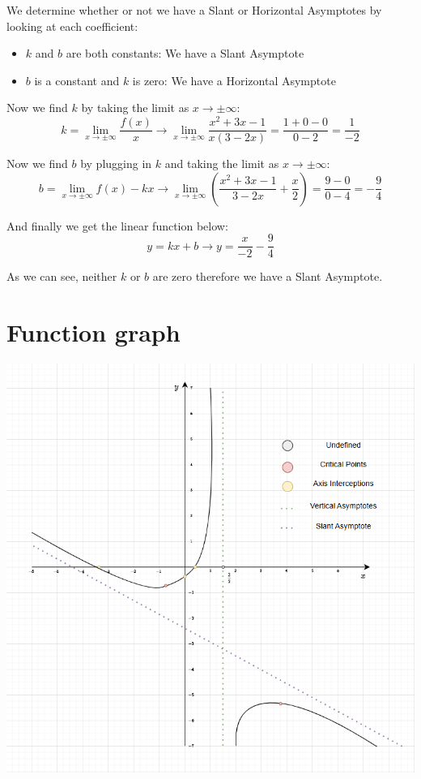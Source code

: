 \documentclass[11pt]{article}
\begin{document}
We determine whether or not we have a Slant or Horizontal Asymptotes by looking at each coefficient:
\begin{itemize}
\item \(k\) and \(b\) are both constants: We have a Slant Asymptote
\item \(b\) is a constant and \(k\) is zero: We have a Horizontal Asymptote
\end{itemize}

Now we find \(k\) by taking the limit as \(x \rightarrow \pm \infty\):
\[
k=\lim_{x\to\pm\infty} \frac{f(x)}{x} \rightarrow \lim_{x\to\pm\infty} \frac{x^2+3x-1}{x(3-2x)} = \frac{1+0-0}{0-2} = \frac{1}{-2}
\]

Now we find \(b\) by plugging in \(k\) and taking the limit as \(x \rightarrow \pm \infty\):
\[
b=\lim_{x\to\pm\infty} f(x)-kx \rightarrow \lim_{x\to\pm\infty} \left( \frac{x^2+3x-1}{3-2x} + \frac{x}{2} \right) = \frac{9-0}{0-4} = -\frac{9}{4}
\]

And finally we get the linear function below:
\[
y=kx+b \rightarrow y=\frac{x}{-2}-\frac{9}{4}
\]

As we can see, neither \(k\) or \(b\) are zero therefore we have a Slant Asymptote.
\section{Function graph}
\label{sec:org5b3a6f4}
\begin{center}
\includegraphics[width=.9\linewidth]{./holy_balony.png}
\end{center}
\end{document}
